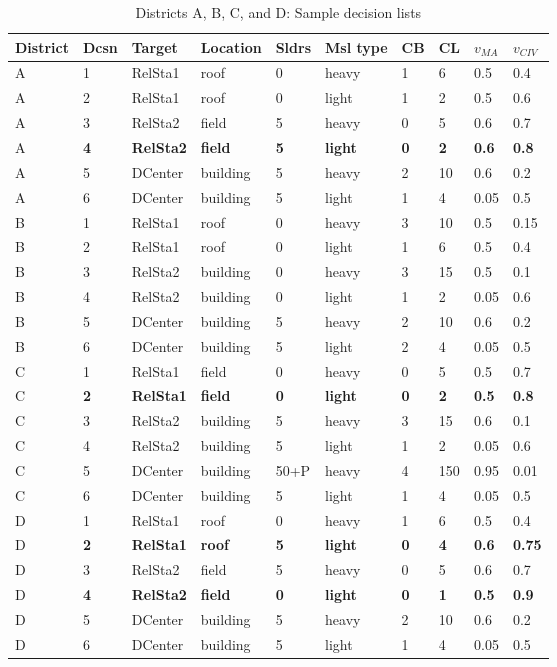 \begin{table}[!htb]
\footnotesize
\caption{Districts A, B, C, and D: Sample decision lists}
\label{table:1}
\begin{tabular}{|l|l|l|l|l|l|l|l|l|l|} 
\hline
District & Dcsn & Target & Location & Sldrs & Msl type &  CB & CL & $v_{MA}$ & $v_{CIV}$ \\ [0.5ex] 
\hline
A & 1 & RelSta1 & roof & 0 & heavy & 1 & 6 & 0.5 & 0.4 \\
A & 2 & RelSta1 &  roof& 0 & light & 1 & 2 & 0.5 & 0.6 \\
A & 3 & RelSta2 & field & 5 & heavy & 0 & 5 & 0.6 & 0.7 \\
A & \textbf{4} & \textbf{RelSta2} & \textbf{field} &\textbf{5} & \textbf{light} & \textbf{0} & \textbf{2} & \textbf{0.6} & \textbf{0.8} \\
A & 5 & DCenter & building & 5 & heavy & 2 & 10 & 0.6 & 0.2 \\
A & 6 & DCenter & building & 5 & light & 1 & 4 & 0.05 & 0.5 \\
\hline
\hline
B & 1 & RelSta1 & roof & 0 & heavy & 3 & 10 & 0.5 & 0.15 \\
B & 2 & RelSta1 & roof & 0 & light & 1 & 6 & 0.5 & 0.4 \\
B & 3 & RelSta2 & building & 0 & heavy & 3 & 15 & 0.5 & 0.1 \\
B & 4 & RelSta2 & building & 0 & light & 1 & 2 & 0.05 & 0.6 \\
B & 5 & DCenter & building & 5 & heavy & 2 & 10 & 0.6 & 0.2 \\
B & 6 & DCenter & building & 5 & light & 2 & 4 & 0.05 & 0.5 \\
\hline
\hline
C & 1 & RelSta1 & field & 0 & heavy & 0 & 5 & 0.5 & 0.7 \\
C & \textbf{2} & \textbf{RelSta1} & \textbf{field} & \textbf{0} & \textbf{light} & \textbf{0} & \textbf{2} & \textbf{0.5} & \textbf{0.8} \\
C & 3 & RelSta2 & building & 5 & heavy & 3 & 15 & 0.6 & 0.1 \\
C & 4 & RelSta2 & building & 5 & light & 1 & 2 & 0.05 & 0.6 \\
C & 5 & DCenter & building & 50+P & heavy & 4 & 150 & 0.95 & 0.01 \\
C & 6 & DCenter & building & 5 & light & 1 & 4 & 0.05 & 0.5 \\
\hline
\hline
D & 1 & RelSta1 & roof & 0 & heavy & 1 & 6 & 0.5 & 0.4 \\
D & \textbf{2} & \textbf{RelSta1} &  \textbf{roof} & \textbf{5} & \textbf{light} & \textbf{0} & \textbf{4} & \textbf{0.6} & \textbf{0.75} \\
D & 3 & RelSta2 & field & 5 & heavy & 0 & 5 & 0.6 & 0.7 \\
D & \textbf{4} & \textbf{RelSta2} & \textbf{field} &\textbf{0} & \textbf{light} & \textbf{0} & \textbf{1} & \textbf{0.5} & \textbf{0.9} \\
D & 5 & DCenter & building & 5 & heavy & 2 & 10 & 0.6 & 0.2 \\
D & 6 & DCenter & building & 5 & light & 1 & 4 & 0.05 & 0.5 \\
\hline
\end{tabular}

\end{table}

